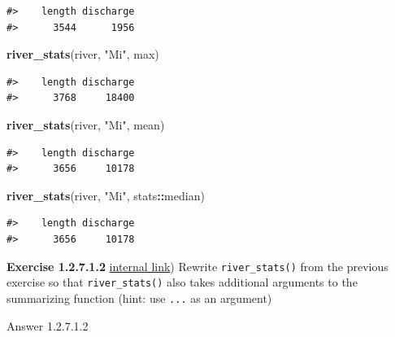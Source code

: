 \documentclass[
]{book}
\newenvironment{Shaded}{\begin{snugshade}}{\end{snugshade}}
\newcommand{\KeywordTok}[1]{\textcolor[rgb]{0.13,0.29,0.53}{\textbf{#1}}}
\newcommand{\NormalTok}[1]{#1}
\newcommand{\OperatorTok}[1]{\textcolor[rgb]{0.81,0.36,0.00}{\textbf{#1}}}
\newcommand{\StringTok}[1]{\textcolor[rgb]{0.31,0.60,0.02}{#1}}
\begin{document}
\begin{verbatim}
#>    length discharge 
#>      3544      1956
\end{verbatim}

\begin{Shaded}
\begin{Highlighting}[]
\KeywordTok{river_stats}\NormalTok{(river, }\StringTok{"Mi"}\NormalTok{, max)}
\end{Highlighting}
\end{Shaded}

\begin{verbatim}
#>    length discharge 
#>      3768     18400
\end{verbatim}

\begin{Shaded}
\begin{Highlighting}[]
\KeywordTok{river_stats}\NormalTok{(river, }\StringTok{"Mi"}\NormalTok{, mean)}
\end{Highlighting}
\end{Shaded}

\begin{verbatim}
#>    length discharge 
#>      3656     10178
\end{verbatim}

\begin{Shaded}
\begin{Highlighting}[]
\KeywordTok{river_stats}\NormalTok{(river, }\StringTok{"Mi"}\NormalTok{, stats}\OperatorTok{::}\NormalTok{median)}
\end{Highlighting}
\end{Shaded}

\begin{verbatim}
#>    length discharge 
#>      3656     10178
\end{verbatim}

\textbf{Exercise 1.2.7.1.2} \protect\hyperlink{ex-set3}{internal link})
Rewrite \texttt{river\_stats()} from the previous exercise so that \texttt{river\_stats()} also takes additional arguments to the summarizing function (hint: use \texttt{...} as an argument)

Answer 1.2.7.1.2
\end{document}
